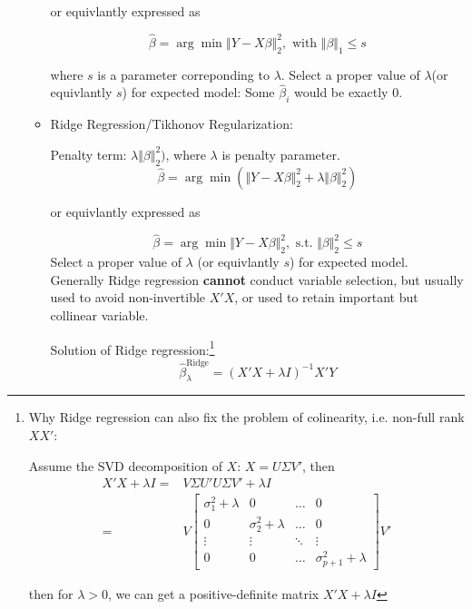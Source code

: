 \begin{itemize}[topsep=2pt,itemsep=0pt]
\begin{itemize}[topsep=2pt,itemsep=2pt]
    or equivlantly expressed as 

\begin{equation}
    \hat{\beta }=\arg\min \left\Vert Y-X\beta \right\Vert _2 ^2, \text{ with }\Vert \beta \Vert _1\leq s
\end{equation}

where $ s $ is a parameter correponding to $ \lambda  $. Select a proper value of $ \lambda  $(or equivlantly $ s $) for expected model: Some $ \hat{\beta }_i $ would be exactly $ 0 $.



\item Ridge Regression/Tikhonov Regularization:

Penalty term: $ \lambda\Vert \beta \Vert _2^2) $, where $ \lambda  $ is penalty parameter.
\begin{equation}
    \hat{\beta }=\arg\min (\Vert Y-X\beta \Vert _2 ^2+\lambda\Vert \beta \Vert _2^2)
\end{equation}

    or equivlantly expressed as 

\begin{equation}
    \hat{\beta }=\arg\min \Vert Y-X\beta \Vert _2 ^2, \text{ s.t. }\Vert \beta \Vert ^2_2\leq s
\end{equation}
Select a proper value of $ \lambda  $ (or equivlantly $ s $) for expected model. Generally Ridge regression \textbf{cannot} conduct variable selection, but usually used to avoid non-invertible $ X'X $, or used to retain important but collinear variable.

Solution of Ridge regression:\footnote{Why Ridge regression can also fix the problem of colinearity, i.e. non-full rank $ XX' $:

Assume the SVD decomposition of $ X $: $ X=U\Sigma V' $, then 
\begin{align*}
    X'X+\lambda I=&V\Sigma U'U\Sigma V'+\lambda I\\
    =& V \begin{bmatrix}
    \sigma^2 _{1}+\lambda &0&\ldots&0\\
    0&\sigma^2 _{2}+\lambda &\ldots&0\\
    \vdots&\vdots&\ddots&\vdots\\
    0&0&\ldots&\sigma^2 _{p+1}+\lambda 
    \end{bmatrix}V'
\end{align*}

then for $ \lambda >0 $, we can get a positive-definite matrix $ X'X+\lambda I $
}
\begin{equation}
    \hat{\beta }^\mathrm{Ridge}_\lambda  =(X'X+\lambda I)^{-1}X'Y
\end{equation}




\end{itemize}
\end{itemize}
